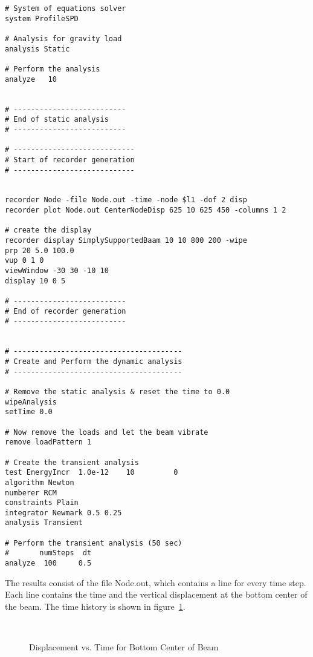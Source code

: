 \documentclass[12pt]{article}
\begin{document}
{\begin{verbatim}
# System of equations solver
system ProfileSPD

# Analysis for gravity load
analysis Static

# Perform the analysis
analyze   10     


# --------------------------
# End of static analysis
# --------------------------

# ----------------------------
# Start of recorder generation
# ----------------------------


recorder Node -file Node.out -time -node $l1 -dof 2 disp
recorder plot Node.out CenterNodeDisp 625 10 625 450 -columns 1 2

# create the display
recorder display SimplySupportedBaam 10 10 800 200 -wipe
prp 20 5.0 100.0
vup 0 1 0
viewWindow -30 30 -10 10
display 10 0 5

# --------------------------
# End of recorder generation
# --------------------------


# ---------------------------------------
# Create and Perform the dynamic analysis
# ---------------------------------------

# Remove the static analysis & reset the time to 0.0
wipeAnalysis
setTime 0.0

# Now remove the loads and let the beam vibrate
remove loadPattern 1

# Create the transient analysis
test EnergyIncr  1.0e-12    10         0
algorithm Newton
numberer RCM
constraints Plain 
integrator Newmark 0.5 0.25
analysis Transient

# Perform the transient analysis (50 sec)
#       numSteps  dt
analyze  100     0.5

\end{verbatim}
}

\vspace{0.2in} 

The results consist of the file Node.out, which contains a line for
every time step. 
Each line contains the time and the vertical
displacement 
at the bottom center of the beam.
The time history is shown in
figure~\ref{beamdisp}. 
\begin{figure}[h]
\begin{center}
\leavevmode
\hbox{%
\epsfxsize=4.0in
\epsfysize=2.8in
}
\end{center}
\caption{Displacement vs. Time for Bottom Center of Beam}
\label{beamdisp}
\end{figure}
\end{document}
